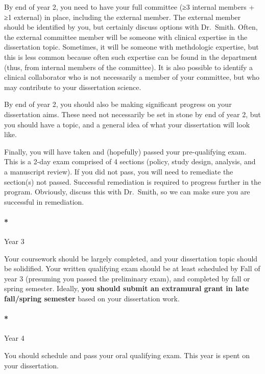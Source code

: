 \documentclass[
  letterpaper,
  DIV=11,
  numbers=noendperiod]{scrreprt}
\let\oldparagraph\paragraph
\renewcommand{\paragraph}[1]{\oldparagraph{#1}\mbox{}}
\begin{document}
By end of year 2, you need to have your full committee (≥3 internal
members + ≥1 external) in place, including the external member. The
external member should be identified by you, but certainly discuss
options with Dr.~Smith. Often, the external committee member will be
someone with clinical expertise in the dissertation topic. Sometimes, it
will be someone with methdologic expertise, but this is less common
because often such expertise can be found in the department (thus, from
internal members of the committee). It is also possible to identify a
clinical collaborator who is not necessarily a member of your committee,
but who may contribute to your dissertation science.

By end of year 2, you should also be making significant progress on your
dissertation aims. These need not necessarily be set in stone by end of
year 2, but you should have a topic, and a general idea of what your
dissertation will look like.

Finally, you will have taken and (hopefully) passed your pre-qualifying
exam. This is a 2-day exam comprised of 4 sections (policy, study
design, analysis, and a manuscript review). If you did not pass, you
will need to remediate the section(s) not passed. Successful remediation
is required to progress further in the program. Obviously, discuss this
with Dr.~Smith, so we can make sure you are successful in remediation.

\hypertarget{year-3}{%
\paragraph*{Year 3}\label{year-3}}

Your coursework should be largely completed, and your dissertation topic
should be solidified. Your written qualifying exam should be at least
scheduled by Fall of year 3 (presuming you passed the preliminary exam),
and completed by fall or spring semester. Ideally, \textbf{you should
submit an extramural grant in late fall/spring semester} based on your
dissertation work.

\hypertarget{year-4}{%
\paragraph*{Year 4}\label{year-4}}

You should schedule and pass your oral qualifying exam. This year is
spent on your dissertation.
\end{document}
